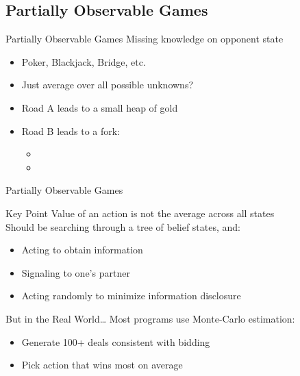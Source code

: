 \documentclass[14pt]{beamer}
\begin{document}
\subsection{Partially Observable Games}
\begin{frame}[label=partially-observable-games]{Partially Observable Games}
Missing knowledge on opponent state
\begin{itemize}
\item Poker, Blackjack, Bridge, etc.
\item<2-> Just average over all possible unknowns? 
\end{itemize}
\bigskip
{}
\begin{itemize}
\item<3-> \alert<8->{Road A} leads to a small heap of gold
\item<3-> \alert<4,6>{Road B} leads to a fork:
	\begin{itemize}
	\item<3-> 
	\item<3-> 
	\end{itemize}
\end{itemize}
\end{frame}
\begin{frame}{Partially Observable Games}
	\begin{block}{Key Point}
		Value of an action is not the average across all states \\
		\pause
		Should be searching through a tree of belief states, and:
		\begin{itemize}
			\item Acting to obtain information
			\item Signaling to one's partner
			\item Acting randomly to minimize information disclosure
		\end{itemize}
	\end{block}
	\pause
	\begin{block}{But in the Real World\ldots}
		Most programs use Monte-Carlo estimation:
		\begin{itemize}
			\item Generate 100+ deals consistent with bidding
			\item Pick action that wins most on average
		\end{itemize}
	\end{block}
\end{frame}
\end{document}
